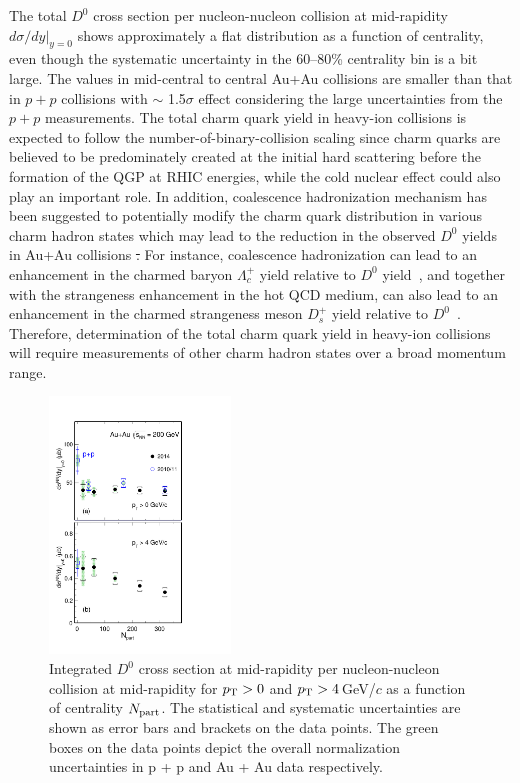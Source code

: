 \documentclass[%
 reprint,	
 amsmath,amssymb,
 aps,
 prc,
]{revtex4-1}
\providecommand{\DIFaddtex}[1]{{\protect\color{blue}\uwave{#1}}} %
\providecommand{\DIFdeltex}[1]{{\protect\color{red}\sout{#1}}}                      %
\providecommand{\DIFaddbegin}{} %
\providecommand{\DIFaddend}{} %
\providecommand{\DIFdelbegin}{} %
\providecommand{\DIFdelend}{} %
\providecommand{\DIFadd}[1]{\texorpdfstring{\DIFaddtex{#1}}{#1}} %
\providecommand{\DIFdel}[1]{\texorpdfstring{\DIFdeltex{#1}}{}} %
\begin{document}
The total $D^0$ cross section per nucleon-nucleon collision at mid-rapidity $d\sigma/dy|_{y=0}$ shows approximately a flat distribution as a function of centrality, even though the systematic uncertainty in the 60--80\% centrality bin is a bit large. The values in mid-central to central Au+Au collisions are smaller than that in $p+p$ collisions with $\sim$ 1.5$\sigma$ effect considering the large uncertainties from the $p+p$ measurements. The total charm quark yield in heavy-ion collisions is expected to follow the number-of-binary-collision scaling since charm quarks are believed to be predominately created at the initial hard scattering before the formation of the QGP at RHIC energies, while the cold nuclear effect could also play an important role. In addition, coalescence hadronization mechanism has been suggested to potentially modify the charm quark distribution in various charm hadron states which may lead to the reduction in the observed $D^0$ yields in Au+Au collisions \DIFdelbegin \DIFdel{. }\DIFdelend \DIFaddbegin \DIFadd{(as seen in Fig.~\ref{fig:Xsection_D0}). }\DIFaddend For instance, coalescence hadronization can lead to an enhancement in the charmed baryon $\Lambda_{c}^+$ yield relative to $D^0$ yield~\cite{Oh2009}, and together with the strangeness enhancement in the hot QCD medium, can also lead to an enhancement in the charmed strangeness meson $D_{s}^+$ yield relative to $D^0$~\cite{He2013}. Therefore, determination of the total charm quark yield in heavy-ion collisions will require measurements of other charm hadron states over a broad momentum range.

\begin{figure}
\centering
\includegraphics[width=0.43\textwidth]{fig/Xsection_D0.pdf}
\caption{Integrated $D^{0}$ cross section at mid-rapidity per nucleon-nucleon collision at mid-rapidity for $p_{\rm T}>0$ and $p_{\rm T}>4$\,GeV/$c$ as a function of centrality $N_{\rm part}$. The statistical and systematic uncertainties are shown as error bars and brackets on the data points. The green boxes on the data points depict the overall normalization uncertainties in p + p and Au + Au data respectively.}
\label{fig:Xsection_D0} 
\end{figure}
\end{document}
